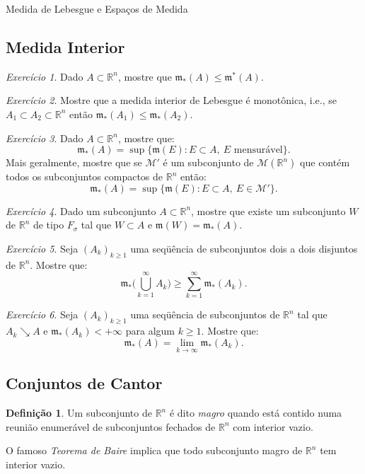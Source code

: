 \documentclass[oneside,final,11pt]{amsbook}
\newcommand{\R}{\mathds R}
\newcommand{\leb}{\mathfrak m}
\newcommand{\Lebmens}{\mathcal M}
\theoremstyle{remark}\newtheorem{exercise}{Exercício}[chapter]
\theoremstyle{remark}\newtheorem{*exercise}[exercise]{\hbox to 0pt{\hskip 0pt minus 1fil*}Exercício}
\theoremstyle{definition}\newtheorem{exdefin}{Definição}[chapter]
\theoremstyle{plain}\newtheorem{teo}{Teorema}[section]
\theoremstyle{plain}\newtheorem{lem}[teo]{Lema}
\theoremstyle{plain}\newtheorem{prop}[teo]{Proposição}
\theoremstyle{plain}\newtheorem{cor}[teo]{Corolário}
\theoremstyle{definition}\newtheorem{defin}[teo]{Definição}
\theoremstyle{remark}\newtheorem{rem}[teo]{Observação}
\theoremstyle{definition}\newtheorem{notation}[teo]{Notação}
\theoremstyle{definition}\newtheorem{convention}[teo]{Convenção}
\theoremstyle{definition}\newtheorem{example}[teo]{Exemplo}
\numberwithin{section}{chapter}
\numberwithin{equation}{section}
\begin{document}
\begin{chapter}{Medida de Lebesgue e Espaços de Medida}
\subsection*{Medida Interior}

\begin{exercise}\label{exe:lebintlelebext}
Dado $A\subset\R^n$, mostre que $\leb_*(A)\le\leb^*(A)$.
\end{exercise}

\begin{exercise}\label{exe:medintmonot}
Mostre que a medida interior de Lebesgue é mo\-no\-tô\-ni\-ca, i.e., se $A_1\subset A_2\subset\R^n$
então $\leb_*(A_1)\le\leb_*(A_2)$.
\end{exercise}

\begin{exercise}\label{exe:alternativamedint}
Dado $A\subset\R^n$, mostre que:
\[\leb_*(A)=\sup\big\{\leb(E):E\subset A,\ \text{$E$ mensurável}\big\}.\]
Mais geralmente, mostre que se $\mathcal M'$ é um subconjunto de $\Lebmens(\R^n)$ que contém
todos os subconjuntos compactos de $\R^n$ então:
\[\leb_*(A)=\sup\big\{\leb(E):E\subset A,\ E\in\mathcal M'\big\}.\]
\end{exercise}

\begin{exercise}\label{exe:internalmens}
Dado um subconjunto $A\subset\R^n$, mostre que existe um subconjunto $W$ de $\R^n$ de tipo $F_\sigma$
tal que $W\subset A$ e $\leb(W)=\leb_*(A)$.
\end{exercise}

\begin{exercise}\label{exe:intersuperadd}
Seja $(A_k)_{k\ge1}$ uma seqüência de subconjuntos dois a dois disjuntos de $\R^n$. Mostre que:
\[\leb_*\Big(\bigcup_{k=1}^\infty A_k\Big)\ge\sum_{k=1}^\infty\leb_*(A_k).\]
\end{exercise}

\begin{exercise}\label{exe:AksearrowA}
Seja $(A_k)_{k\ge1}$ uma seqüência de subconjuntos de $\R^n$ tal que $A_k\searrow A$ e
$\leb_*(A_k)<+\infty$ para algum $k\ge1$. Mostre que:
\[\leb_*(A)=\lim_{k\to\infty}\leb_*(A_k).\]
\end{exercise}

\subsection*{Conjuntos de Cantor}

\begin{exdefin}
Um subconjunto de $\R^n$ é dito {\em magro\/} quando
está contido numa reunião enumerável de subconjuntos fechados de $\R^n$ com interior vazio.
\end{exdefin}
O famoso {\em Teorema de Baire\/}
implica que todo subconjunto magro de $\R^n$ tem interior vazio.


\end{chapter}
\end{document}
